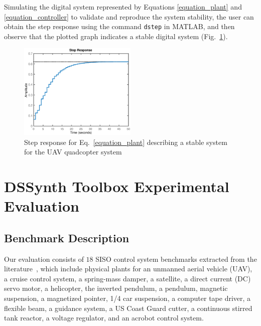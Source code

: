 \documentclass[conference]{IEEEtran}
\newcommand\tool{{DSSynth Toolbox}\xspace}
\begin{document}
Simulating the digital system represented by Equations
\eqref{equation_plant} and \eqref{equation_controller} to validate and
reproduce the system stability, the user can obtain the step response using
the command \texttt{dstep} in MATLAB, and then observe that the plotted
graph indicates a stable digital system (Fig.~\ref{step-response}).

\begin{figure}[ht]
  \includegraphics[width=0.5\textwidth]{step-response.eps}
  \caption{Step response for Eq.~\eqref{equation_plant} describing a stable system for the UAV quadcopter system}
  \label{step-response}
\end{figure}

\section{\tool Experimental Evaluation}

\subsection{Benchmark Description}
\label{benchmarks-description}

Our evaluation consists of $18$ SISO control system benchmarks extracted
from the literature~\cite{abate2017, abatecav2017, bouabdallah, acrobot,
cstr, KOKOTOVIC198023, gajic2008optimal, Franklin15, maglev, converters,
CTMS, DBLP:journals/tc/BessaIPCF17, DBLP:journals/dafes/BessaICF16}, which
include physical plants for an unmanned aerial vehicle (UAV), a cruise
control system, a spring-mass damper, a satellite, a direct current (DC)
servo motor, a helicopter, the inverted pendulum, a pendulum, magnetic
suspension, a magnetized pointer, 1/4 car suspension, a computer tape
driver, a flexible beam, a guidance system, a US Coast Guard cutter, a
continuous stirred tank reactor, a voltage regulator, and an acrobot control
system.
\end{document}
